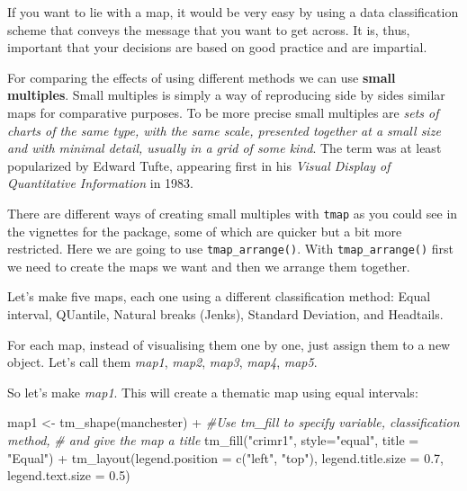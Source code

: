 \documentclass[
]{book}
\makeatletter
\newenvironment{Shaded}{\begin{snugshade}}{\end{snugshade}}
\newcommand{\AttributeTok}[1]{\textcolor[rgb]{0.61,0.61,0.61}{#1}}
\newcommand{\CommentTok}[1]{\textcolor[rgb]{0.37,0.37,0.37}{\textit{#1}}}
\newcommand{\FloatTok}[1]{\textcolor[rgb]{0.06,0.06,0.06}{#1}}
\newcommand{\FunctionTok}[1]{\textcolor[rgb]{0,0,0}{#1}}
\newcommand{\NormalTok}[1]{#1}
\newcommand{\OtherTok}[1]{\textcolor[rgb]{0.37,0.37,0.37}{#1}}
\newcommand{\SpecialCharTok}[1]{\textcolor[rgb]{0,0,0}{#1}}
\newcommand{\StringTok}[1]{\textcolor[rgb]{0.5,0.5,0.5}{#1}}
\newenvironment{kframe}{%
\medskip{}
\setlength{\fboxsep}{.8em}
 \def\at@end@of@kframe{}%
 \ifinner\ifhmode%
  \def\at@end@of@kframe{\end{minipage}}%
  \begin{minipage}{\columnwidth}%
 \fi\fi%
 \def\FrameCommand##1{\hskip\@totalleftmargin \hskip-\fboxsep
 \colorbox{shadecolor}{##1}\hskip-\fboxsep
     \hskip-\linewidth \hskip-\@totalleftmargin \hskip\columnwidth}%
 \MakeFramed {\advance\hsize-\width
   \@totalleftmargin\z@ \linewidth\hsize
   \@setminipage}}%
 {\par\unskip\endMakeFramed%
 \at@end@of@kframe}
\renewenvironment{Shaded}{\begin{kframe}}{\end{kframe}}
\makeatother
\begin{document}
If you want to lie with a map, it would be very easy by using a data classification scheme that conveys the message that you want to get across. It is, thus, important that your decisions are based on good practice and are impartial.

For comparing the effects of using different methods we can use \textbf{small multiples}. Small multiples is simply a way of reproducing side by sides similar maps for comparative purposes. To be more precise small multiples are \emph{sets of charts of the same type, with the same scale, presented together at a small size and with minimal detail, usually in a grid of some kind}. The term was at least popularized by Edward Tufte, appearing first in his \emph{Visual Display of Quantitative Information} in 1983.

There are different ways of creating small multiples with \texttt{tmap} as you could see in the vignettes for the package, some of which are quicker but a bit more restricted. Here we are going to use \texttt{tmap\_arrange()}. With \texttt{tmap\_arrange()} first we need to create the maps we want and then we arrange them together.

Let's make five maps, each one using a different classification method: Equal interval, QUantile, Natural breaks (Jenks), Standard Deviation, and Headtails.

For each map, instead of visualising them one by one, just assign them to a new object. Let's call them \emph{map1}, \emph{map2}, \emph{map3}, \emph{map4}, \emph{map5}.

So let's make \emph{map1}. This will create a thematic map using equal intervals:

\begin{Shaded}
\begin{Highlighting}[]
\NormalTok{map1 }\OtherTok{\textless{}{-}} \FunctionTok{tm\_shape}\NormalTok{(manchester) }\SpecialCharTok{+}    
  \CommentTok{\#Use tm\_fill to specify variable, classification method, }
  \CommentTok{\# and give the map a title}
  \FunctionTok{tm\_fill}\NormalTok{(}\StringTok{"crimr1"}\NormalTok{, }\AttributeTok{style=}\StringTok{"equal"}\NormalTok{, }\AttributeTok{title =} \StringTok{"Equal"}\NormalTok{) }\SpecialCharTok{+} 
  \FunctionTok{tm\_layout}\NormalTok{(}\AttributeTok{legend.position =} \FunctionTok{c}\NormalTok{(}\StringTok{"left"}\NormalTok{, }\StringTok{"top"}\NormalTok{),   }
            \AttributeTok{legend.title.size =} \FloatTok{0.7}\NormalTok{,}
            \AttributeTok{legend.text.size =} \FloatTok{0.5}\NormalTok{)}
\end{Highlighting}
\end{Shaded}
\end{document}
